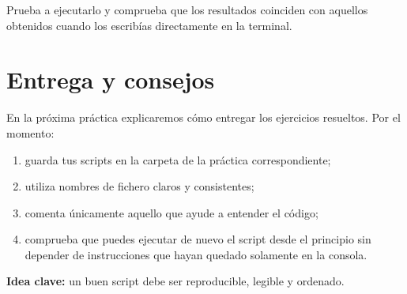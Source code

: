 \documentclass[11pt,a4paper]{article}
\theoremstyle{exercise}
\begin{document}
Prueba a ejecutarlo y comprueba que los resultados coinciden con aquellos obtenidos cuando los escribías directamente en la terminal.


\section{Entrega y consejos}

En la próxima práctica explicaremos cómo entregar los ejercicios resueltos. Por el momento:
\begin{enumerate}[leftmargin=*]
  \item guarda tus scripts en la carpeta de la práctica correspondiente;
  \item utiliza nombres de fichero claros y consistentes;
  \item comenta únicamente aquello que ayude a entender el código;
  \item comprueba que puedes ejecutar de nuevo el script desde el principio sin
        depender de instrucciones que hayan quedado solamente en la consola.
\end{enumerate}


\begin{center}
\textbf{\color{azuluc}Idea clave:} un buen script debe ser reproducible, legible y ordenado.
\end{center}
\end{document}
